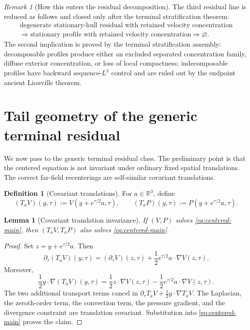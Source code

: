 \documentclass[11pt]{amsart}
\numberwithin{equation}{section}
\theoremstyle{plain}
\newtheorem{lemma}[lemma]{Lemma}
\theoremstyle{definition}
\newtheorem{definition}[definition]{Definition}
\theoremstyle{remark}
\newtheorem{remark}[remark]{Remark}
\newcommand{\R}{\mathbb R}
\begin{document}
\begin{remark}[How this enters the residual decomposition]
\label{rem:R3S-decomposition}
The third residual line is reduced as follows and closed only after the terminal
stratification theorem:
\[
\begin{gathered}
   \text{degenerate stationary-hull residual with retained velocity concentration}\\
   \Longrightarrow
   \text{stationary profile with retained velocity concentration}
   \Longrightarrow
   \varnothing .
\end{gathered}
\]
The second implication is proved by the terminal stratification assembly:
decomposable profiles produce either an excluded separated concentration
family, diffuse exterior concentration, or loss of local compactness;
indecomposable profiles have backward sequence-\(L^3\) control and are ruled
out by the endpoint ancient Liouville theorem.
\end{remark}


\section{Tail geometry of the generic terminal residual}
\label{sec:R4-tail-geometry}

We now pass to the generic terminal residual class.  The preliminary point is that
the centered equation is not invariant under ordinary fixed spatial translations.
The correct far-field recenterings are self-similar covariant translations.

\begin{definition}[Covariant translations]
\label{def:covariant-translations}
For \(a\in\R^3\), define
\[
   (T_aV)(y,\tau):=V(y+e^{\tau/2}a,\tau),
   \qquad
   (T_aP)(y,\tau):=P(y+e^{\tau/2}a,\tau).
\]
\end{definition}

\begin{lemma}[Covariant translation invariance]
\label{lem:covariant-translation-invariance}
If \((V,P)\) solves \eqref{eq:centered-main}, then
\((T_aV,T_aP)\) also solves \eqref{eq:centered-main}.
\end{lemma}

\begin{proof}
Set \(z=y+e^{\tau/2}a\).  Then
\[
   \partial_\tau(T_aV)(y,\tau)
   =
   (\partial_\tau V)(z,\tau)
   +\frac12e^{\tau/2}a\cdot\nabla V(z,\tau).
\]
Moreover,
\[
   \frac12 y\cdot\nabla(T_aV)(y,\tau)
   =
   \frac12 z\cdot\nabla V(z,\tau)
   -\frac12e^{\tau/2}a\cdot\nabla V(z,\tau).
\]
The two additional transport terms cancel in
\(\partial_\tau T_aV+\frac12y\cdot\nabla T_aV\).  The Laplacian, the
zeroth-order term, the convection term, the pressure gradient, and the
divergence constraint are translation covariant.  Substitution into
\eqref{eq:centered-main} proves the claim.
\end{proof}
\end{document}
